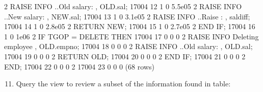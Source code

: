 \documentclass[letterpaper,10pt,english,openany,oneside]{sphinxmanual}
\begin{document}
\begin{sphinxVerbatim}[commandchars=\\\{\}]
    2 \textbar{}         RAISE INFO \PYGZsq{}..Old salary: \PYGZpc{}\PYGZsq{}, OLD.sal;                   \textbar{}    17004 \textbar{}          12 \textbar{}          1 \textbar{}               0 \textbar{}    5.5e\PYGZhy{}05
    2 \textbar{}         RAISE INFO \PYGZsq{}..New salary: \PYGZpc{}\PYGZsq{}, NEW.sal;                   \textbar{}    17004 \textbar{}          13 \textbar{}          1 \textbar{}               0 \textbar{}    3.1e\PYGZhy{}05
    2 \textbar{}         RAISE INFO \PYGZsq{}..Raise     : \PYGZpc{}\PYGZsq{}, sal\PYGZus{}diff;                  \textbar{}    17004 \textbar{}          14 \textbar{}          1 \textbar{}               0 \textbar{}    2.8e\PYGZhy{}05
    2 \textbar{}         RETURN NEW;                                              \textbar{}    17004 \textbar{}          15 \textbar{}          1 \textbar{}               0 \textbar{}    2.7e\PYGZhy{}05
    2 \textbar{}     END IF;                                                      \textbar{}    17004 \textbar{}          16 \textbar{}          1 \textbar{}               0 \textbar{}      1e\PYGZhy{}06
    2 \textbar{}     IF TG\PYGZus{}OP = \PYGZsq{}DELETE\PYGZsq{} THEN                                     \textbar{}    17004 \textbar{}          17 \textbar{}          0 \textbar{}               0 \textbar{}          0
    2 \textbar{}         RAISE INFO \PYGZsq{}Deleting employee \PYGZpc{}\PYGZsq{}, OLD.empno;             \textbar{}    17004 \textbar{}          18 \textbar{}          0 \textbar{}               0 \textbar{}          0
    2 \textbar{}         RAISE INFO \PYGZsq{}..Old salary: \PYGZpc{}\PYGZsq{}, OLD.sal;                   \textbar{}    17004 \textbar{}          19 \textbar{}          0 \textbar{}               0 \textbar{}          0
    2 \textbar{}         RETURN OLD;                                              \textbar{}    17004 \textbar{}          20 \textbar{}          0 \textbar{}               0 \textbar{}          0
    2 \textbar{}     END IF;                                                      \textbar{}    17004 \textbar{}          21 \textbar{}          0 \textbar{}               0 \textbar{}          0
    2 \textbar{} END;                                                             \textbar{}    17004 \textbar{}          22 \textbar{}          0 \textbar{}               0 \textbar{}          0
    2 \textbar{}                                                                  \textbar{}    17004 \textbar{}          23 \textbar{}          0 \textbar{}               0 \textbar{}          0
 (68 rows)
\end{sphinxVerbatim}
\begin{enumerate}
\setcounter{enumi}{10}
\item {} 
Query the  view to review a subset of the information found in  table:

\end{enumerate}
\end{document}
